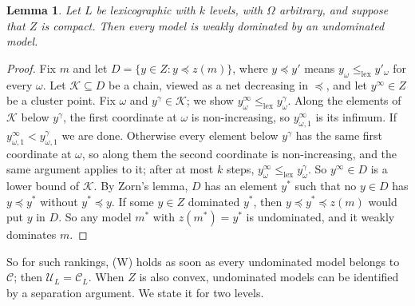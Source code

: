 \documentclass[11pt]{article}
\newtheorem{lemma}[theorem]{Lemma}
\theoremstyle{definition}
\theoremstyle{remark}
\newcommand{\C}{\mathcal C}
\newcommand{\U}{\mathcal U}
\begin{document}
\begin{lemma}\label{lem:zorn}
Let $L$ be lexicographic with $k$ levels, with $\Omega$ arbitrary, and suppose that $Z$ is compact. Then every model is weakly dominated by an undominated model.
\end{lemma}
\begin{proof}
Fix $m$ and let $D=\{y\in Z:y\preceq z(m)\}$, where $y\preceq y'$ means $y_\omega\le_{\mathrm{lex}}y'_\omega$ for every $\omega$. Let $\mathcal K\subseteq D$ be a chain, viewed as a net decreasing in $\preceq$, and let $y^\infty\in Z$ be a cluster point. Fix $\omega$ and $y^\gamma\in\mathcal K$; we show $y^\infty_\omega\le_{\mathrm{lex}}y^\gamma_\omega$. Along the elements of $\mathcal K$ below $y^\gamma$, the first coordinate at $\omega$ is non-increasing, so $y^\infty_{\omega,1}$ is its infimum. If $y^\infty_{\omega,1}<y^\gamma_{\omega,1}$ we are done. Otherwise every element below $y^\gamma$ has the same first coordinate at $\omega$, so along them the second coordinate is non-increasing, and the same argument applies to it; after at most $k$ steps, $y^\infty_\omega\le_{\mathrm{lex}}y^\gamma_\omega$. So $y^\infty\in D$ is a lower bound of $\mathcal K$. By Zorn's lemma, $D$ has an element $y^*$ such that no $y\in D$ has $y\preceq y^*$ without $y^*\preceq y$. If some $y\in Z$ dominated $y^*$, then $y\preceq y^*\preceq z(m)$ would put $y$ in $D$. So any model $m^*$ with $z(m^*)=y^*$ is undominated, and it weakly dominates $m$.
\end{proof}
So for such rankings, (W) holds as soon as every undominated model belongs to $\C$; then $\U_L=\C_L$. When $Z$ is also convex, undominated models can be identified by a separation argument. We state it for two levels.
\end{document}
